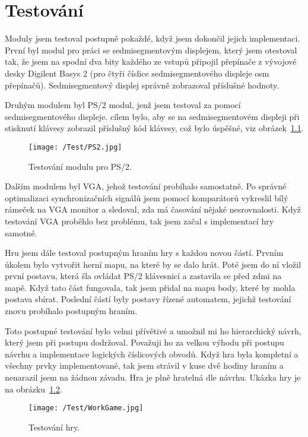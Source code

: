 \documentclass{report}
\begin{document}
\chapter{Testování}\label{sec:testovanichap}
Moduly jsem testoval postupně pokaždé, když jsem dokončil jejich implementaci. První byl modul pro práci se sedmisegmentovým displejem, který jsem otestoval tak, že jsem na spodní dva bity každého ze vstupů připojil přepínače z vývojové desky Digilent Basys 2 (pro čtyři číslice sedmisegmentového displeje osm přepínačů). Sedmisegmentový displej správně zobrazoval příslušné hodnoty. \par 
Druhým modulem byl PS/2 modul, jenž jsem testoval za pomocí sedmisegmentového displeje. cílem bylo, aby se na sedmisegmentovém displeji při stisknutí klávesy zobrazil příslušný kód klávesy, což bylo úspěšné, viz obrázek~\ref{fig:ps2test}.\par
\begin{figure}
\centering
\texttt{[image: /Test/PS2.jpg]}
\caption{Testování modulu pro PS/2.}
\label{fig:ps2test}
\end{figure}
Dalším modulem byl VGA, jehož testování probíhalo samostatně. Po správné optimalizaci synchronizačních signálů jsem pomocí komparátorů vykreslil bílý rámeček na VGA monitor a sledoval, zda má časování nějaké nesrovnalosti. Když testování VGA proběhlo bez problému, tak jsem začal s implementací hry samotné.
\par
Hru jsem dále testoval postupným hraním hry s každou novou částí. Prvním úkolem bylo vytvořit herní mapu, na které by se dalo hrát. Poté jsem do ní vložil první postavu, která šla ovládat PS/2 klávesnicí a zastavila se před zdmi na mapě. Když tato část fungovala, tak jsem přidal na mapu body, které by mohla postava sbírat. Poslední částí byly postavy řízené automatem, jejichž testování znovu probíhalo postupným hraním. 
\par
Toto postupné testování bylo velmi přívětivé a umožnil mi ho hierarchický návrh, který jsem při postupu dodržoval. Považuji ho za velkou výhodu při postupu návrhu a implementace logických číslicových obvodů. Když hra byla kompletní a všechny prvky implementované, tak jsem strávil v kuse dvě hodiny hraním a nenarazil jsem na žádnou závadu. Hra je plně hratelná dle návrhu. Ukázka hry je na obrázku~\ref{fig:gametest}.\par
\begin{figure}
\centering
\texttt{[image: /Test/WorkGame.jpg]}
\caption{Testování hry.}
\label{fig:gametest}
\end{figure}
\end{document}
